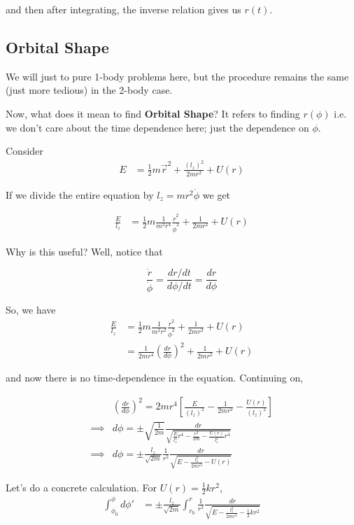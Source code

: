 \documentclass[11pt]{article}
\begin{document}
and then after integrating, the inverse relation gives us $r(t)$.

\vskip 1cm
\subsection{Orbital Shape}
We will just to pure 1-body problems here, but the procedure remains the same (just more tedious) in the 2-body case.

\vskip 0.5cm
Now, what does it mean to find \textbf{Orbital Shape}? It refers to finding $r(\phi)$ i.e. we don't care about the time dependence here; just the dependence on $\phi$.

\vskip 0.5cm
Consider 
\begin{align*}
  E &= \frac{1}{2} m\vec{r}^2 + \frac{(l_z)^2}{2 m r^2} + U(r)
\end{align*}

If we divide the entire equation by $l_z = mr^2 \dot{\phi}$ we get 

\begin{align*}
  \frac{E}{l_{z}} &= \frac{1}{2} m \frac{1}{m^2 r^4} \frac{\dot{r}^2}{\dot{\phi}^2} + \frac{1}{2m r^2} + U(r)
\end{align*}

Why is this useful? Well, notice that 

\[ \frac{\dot{r}}{\dot{\phi}} = \frac{dr/dt}{d\phi / dt}  = \frac{dr}{d\phi} \]

So, we have 
\begin{align*}
  \frac{E}{l_{z}} &= \frac{1}{2} m \frac{1}{m^2 r^2} \frac{\dot{r}^2}{\dot{\phi}^2} + \frac{1}{2m r^2} + U(r) \\
  &= \frac{1}{2 mr^4} \left( \frac{dr}{d\phi} \right)^2 + \frac{1}{2m r^2} + U(r)
\end{align*}

and now there is no time-dependence in the equation. Continuing on,

\begin{align*}
  &\left(\frac{dr}{d\phi}\right)^2 = 2mr^4 \left[ \frac{E}{(l_z)^2} - \frac{1}{2mr^2} - \frac{U(r)}{(l_z)^2} \right] \\
  \implies& d\phi = \pm \sqrt{\frac{1}{2m}} \frac{dr}{\sqrt{ \frac{E}{l_z^2} r^4 - \frac{r^2}{2m} - \frac{U(r)}{l_z^2} r^4 }}  \\
  \implies& \boxed{d\phi = \pm \frac{l_z}{\sqrt{2m}} \frac{1}{r^2} \frac{dr}{\sqrt{E - \frac{l_z^2}{2mr^2} - U(r)}}  }
\end{align*}

\vskip 0.5cm
Let's do a concrete calculation. For $U(r) = \frac{1}{2} kr^2$, 
\begin{align*}
  \int_{\phi_{0}}^{\phi} d\phi' &= \pm \frac{l_z}{\sqrt{2m}} \int_{r_{0}}^{r} \frac{1}{r^2} \frac{dr}{\sqrt{E - \frac{l_z^2}{2mr^2} - \frac{1}{2}kr^2}}
\end{align*}
\end{document}
